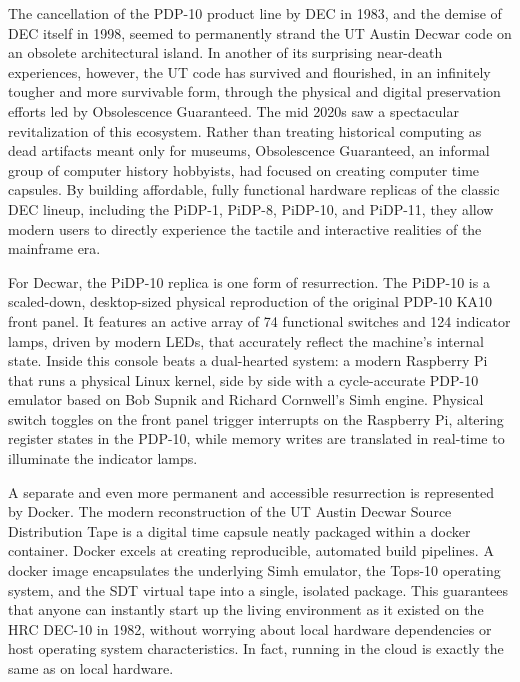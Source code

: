 The cancellation of the PDP-10 product line by DEC in 1983, and the demise of DEC itself in 1998, seemed to permanently strand the UT Austin Decwar code on an obsolete architectural island. In another of its surprising near-death experiences, however, the UT code has survived and flourished, in an infinitely tougher and more survivable form, through the physical and digital preservation efforts led by Obsolescence Guaranteed. The mid 2020s saw a spectacular revitalization of this ecosystem. Rather than treating historical computing as dead artifacts meant only for museums, Obsolescence Guaranteed, an informal group of computer history hobbyists, had focused on creating computer time capsules. By building affordable, fully functional hardware replicas of the classic DEC lineup, including the PiDP-1, PiDP-8, PiDP-10, and PiDP-11, they allow modern users to directly experience the tactile and interactive realities of the mainframe era.

For Decwar, the PiDP-10 replica is one form of resurrection. The PiDP-10 is a scaled-down, desktop-sized physical reproduction of the original PDP-10 KA10 front panel. It features an active array of 74 functional switches and 124 indicator lamps, driven by modern LEDs, that accurately reflect the machine's internal state. Inside this console beats a dual-hearted system: a modern Raspberry Pi that runs a physical Linux kernel, side by side with a cycle-accurate PDP-10 emulator based on Bob Supnik and Richard Cornwell's Simh engine. Physical switch toggles on the front panel trigger interrupts on the Raspberry Pi, altering register states in the PDP-10, while memory writes are translated in real-time to illuminate the indicator lamps. 

A separate and even more permanent and accessible resurrection is represented by Docker. The modern reconstruction of the UT Austin Decwar Source Distribution Tape is a digital time capsule neatly packaged within a docker container. Docker excels at creating reproducible, automated build pipelines. A docker image encapsulates the underlying Simh emulator, the Tops-10 operating system, and the SDT virtual tape into a single, isolated package. This guarantees that anyone can instantly start up the living environment as it existed on the HRC DEC-10 in 1982, without worrying about local hardware dependencies or host operating system characteristics. In fact, running in the cloud is exactly the same as on local hardware. 

